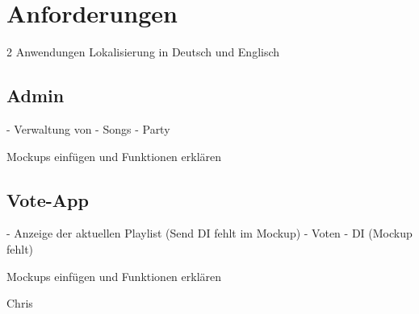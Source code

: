 \section{Anforderungen}

2 Anwendungen
Lokalisierung in Deutsch und Englisch

\subsection{Admin}
- Verwaltung von
  - Songs
  - Party
  
Mockups einfügen und Funktionen erklären

\subsection{Vote-App}
- Anzeige der aktuellen Playlist (Send DI fehlt im Mockup)
- Voten
- DI (Mockup fehlt)

Mockups einfügen und Funktionen erklären

Chris